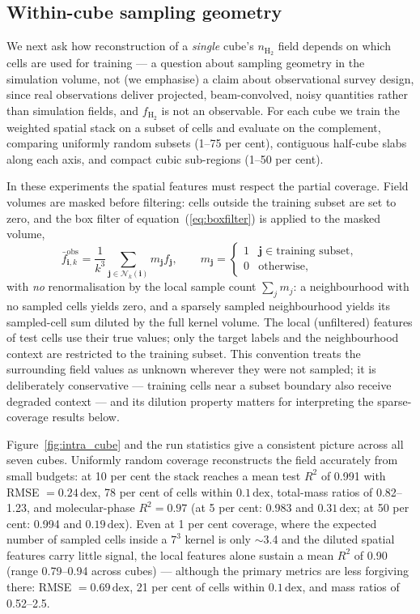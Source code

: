 \documentclass[fleqn,usenatbib]{rasti}
\newcommand{\nHH}{n_{\mathrm{H_2}}}
\newcommand{\fshield}{f_{\mathrm{H_2}}}
\newcommand{\dex}{\,\text{dex}}
\newcommand{\Rsq}{R^2}
\begin{document}
\subsection{Within-cube sampling geometry}
\label{sec:intra_cube}

We next ask how reconstruction of a \emph{single} cube's \(\nHH\) field
depends on which cells are used for training --- a question about
sampling geometry in the simulation volume, not (we emphasise) a claim
about observational survey design, since real observations deliver
projected, beam-convolved, noisy quantities rather than simulation
fields, and \(\fshield\) is not an observable. For each cube we train the
weighted spatial stack on a subset of cells and evaluate on the
complement, comparing uniformly random subsets (1--75 per cent),
contiguous half-cube slabs along each axis, and compact cubic
sub-regions (1--50 per cent).

In these experiments the spatial features must respect the partial
coverage. Field volumes are masked before filtering: cells outside the
training subset are set to zero, and the box filter of
equation~(\ref{eq:boxfilter}) is applied to the masked volume,
\begin{equation}
  \bar{f}^{\mathrm{obs}}_{\bm{i},k} = \frac{1}{k^3}
    \sum_{\bm{j} \in \mathcal{N}_k(\bm{i})} m_{\bm{j}} f_{\bm{j}},
  \qquad
  m_{\bm{j}} =
  \begin{cases}
    1 & \bm{j} \in \text{training subset},\\
    0 & \text{otherwise},
  \end{cases}
  \label{eq:maskedfilter}
\end{equation}
with \emph{no} renormalisation by the local sample count
\(\sum_j m_j\): a neighbourhood with no sampled cells yields zero, and a
sparsely sampled neighbourhood yields its sampled-cell sum diluted by
the full kernel volume. The local (unfiltered) features of test cells
use their true values; only the target labels and the neighbourhood
context are restricted to the training subset. This convention treats
the surrounding field values as unknown wherever they were not sampled;
it is deliberately conservative --- training cells near a subset
boundary also receive degraded context --- and its dilution property
matters for interpreting the sparse-coverage results below.

Figure~\ref{fig:intra_cube} and the run statistics give a consistent
picture across all seven cubes. Uniformly random coverage reconstructs
the field accurately from small budgets: at 10 per cent the stack
reaches a mean test \(\Rsq\) of 0.991 with RMSE \(= 0.24\dex\), 78 per cent
of cells within \(0.1\dex\), total-mass ratios of 0.82--1.23, and
molecular-phase \(\Rsq = 0.97\) (at 5 per cent: 0.983 and \(0.31\dex\); at
50 per cent: 0.994 and \(0.19\dex\)). Even at 1 per cent coverage, where
the expected number of sampled cells inside a \(7^3\) kernel is only
\(\sim\)3.4 and the diluted spatial features carry little signal, the
local features alone sustain a mean \(\Rsq\) of 0.90 (range 0.79--0.94
across cubes) --- although the primary metrics are less forgiving
there: RMSE \(= 0.69\dex\), 21 per cent of cells within \(0.1\dex\), and
mass ratios of 0.52--2.5.
\end{document}
